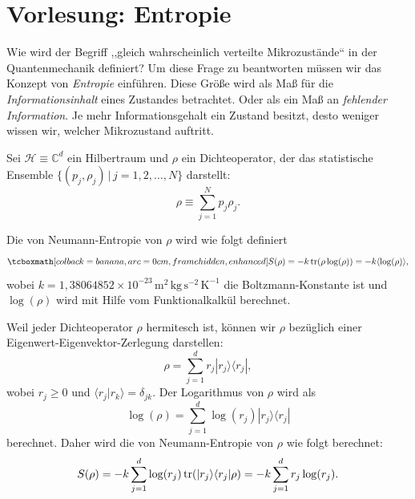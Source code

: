 
\section{Vorlesung: Entropie}
Wie wird der Begriff ,,gleich wahrscheinlich verteilte Mikrozustände`` in der Quantenmechanik definiert? Um diese Frage zu beantworten müssen wir das Konzept von \emph{Entropie} einführen. Diese Größe wird als Maß für die \emph{Informationsinhalt} eines Zustandes betrachtet. Oder als ein Maß an \emph{fehlender Information}. Je mehr Informationsgehalt ein Zustand besitzt, desto weniger wissen wir, welcher Mikrozustand auftritt. 

Sei $\mathcal{H} \equiv \mathbb{C}^d$ ein Hilbertraum und $\rho$ ein Dichteoperator, der das statistische Ensemble $\{(p_j,\rho_j)\,|\, j=1,2, \ldots, N\}$ darstellt:
\begin{equation}
  \rho \equiv \sum_{j=1}^N p_j \rho_j.
\end{equation}

Die von Neumann-Entropie von $\rho$ wird wie folgt definiert
\begin{equation}
  \eqbox{S(\rho) = -k\tr(\rho\log(\rho)) = -k\langle \log(\rho)\rangle,}    
\end{equation} 
wobei $k=1,38064852 \times 10^{-23} \, \text{m}^2 \,\text{kg} \,\text{s}^{-2} \,\text{K}^{-1}$ die Boltzmann-Konstante ist und $\log(\rho)$ wird mit Hilfe vom Funktionalkalkül berechnet. 

Weil jeder Dichteoperator $\rho$ hermitesch ist, können wir $\rho$ bezüglich einer Eigenwert-Eigenvektor-Zerlegung darstellen:
\begin{equation}
  \rho = \sum_{j=1}^d r_j |r_j\rangle\langle r_j|,
\end{equation}
wobei $r_j\ge 0$ und $\langle r_j|r_k\rangle = \delta_{jk}$. Der Logarithmus von $\rho$ wird als
\begin{equation}
  \log(\rho) = \sum_{j=1}^d \log(r_j) |r_j\rangle\langle r_j|
\end{equation}
berechnet. Daher wird die von Neumann-Entropie von $\rho$ wie folgt berechnet:
\begin{equation}
  S(\rho) = -k\sum_{j=1}^d \log(r_j) \operatorname{tr}(|r_j\rangle\langle r_j|\rho) = -k\sum_{j=1}^d r_j\log(r_j).
\end{equation}

